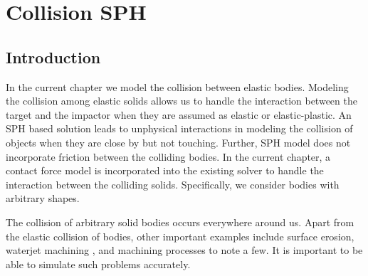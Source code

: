 \chapter{Collision SPH}
\label{chap:csph}



\section{Introduction}
\label{sec:intro}
In the current chapter we model the collision between elastic bodies. Modeling
the collision among elastic solids allows us to handle the interaction between
the target and the impactor when they are assumed as elastic or elastic-plastic.
An SPH based solution leads to unphysical interactions in modeling the collision
of objects when they are close by but not touching. Further, SPH model does not
incorporate friction between the colliding bodies. In the current chapter, a
contact force model is incorporated into the existing solver to handle the
interaction between the colliding solids. Specifically, we consider bodies with
arbitrary shapes.


The collision of arbitrary solid bodies occurs everywhere around us. Apart
from the elastic collision of bodies, other important examples include surface
erosion, waterjet machining \parencite{natarajan2020abrasive}, and machining
processes \parencite{islam2020numerical} to note a few. It is important to be able
to simulate such problems accurately.


